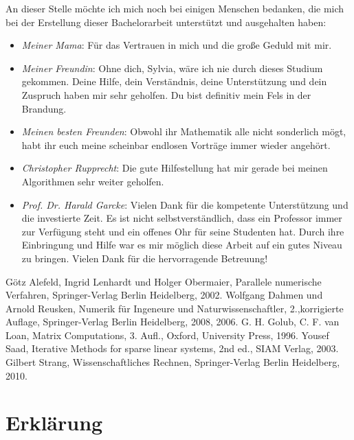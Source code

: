 \begin{large}
An dieser Stelle möchte ich mich noch bei einigen Menschen bedanken, die mich bei der Erstellung dieser Bachelorarbeit unterstützt und ausgehalten haben:
\begin{itemize}
\item \textit{Meiner Mama}: Für das Vertrauen in mich und die große Geduld mit mir.
\item \textit{Meiner Freundin}: Ohne dich, Sylvia, wäre ich nie durch dieses Studium gekommen. Deine Hilfe, dein Verständnis, deine Unterstützung und dein Zuspruch haben mir sehr geholfen. Du bist definitiv mein Fels in der Brandung.
\item \textit{Meinen besten Freunden}: Obwohl ihr Mathematik alle nicht sonderlich mögt, habt ihr euch meine scheinbar endlosen Vorträge immer wieder angehört.
\item \textit{Christopher Rupprecht}: Die gute Hilfestellung hat mir gerade bei meinen Algorithmen sehr weiter geholfen.
\item \textit{Prof. Dr. Harald Garcke}:  Vielen Dank für die kompetente Unterstützung und die investierte Zeit. Es ist nicht selbstverständlich, dass ein Professor immer zur Verfügung steht und ein offenes Ohr für seine Studenten hat. Durch ihre Einbringung und Hilfe war es mir möglich diese Arbeit auf ein gutes Niveau zu bringen. Vielen Dank für die hervorragende Betreuung!
\end{itemize}
\end{large}

\begin{thebibliography}{56}

Götz Alefeld, Ingrid Lenhardt und Holger Obermaier,
Parallele numerische Verfahren,
Springer-Verlag Berlin Heidelberg,
2002.
Wolfgang Dahmen und Arnold Reusken,
Numerik für Ingeneure und Naturwissenschaftler,
2.,korrigierte Auflage,
Springer-Verlag Berlin Heidelberg,
2008, 2006.
G. H. Golub, C. F. van Loan,
Matrix Computations,
3. Aufl.,
Oxford,
University Press,
1996.
Yousef Saad,
Iterative Methods for sparse linear systems,
2nd ed.,
SIAM Verlag,
2003.
Gilbert Strang,
Wissenschaftliches Rechnen,
Springer-Verlag Berlin Heidelberg,
2010.

\end{thebibliography}


\chapter*{Erklärung}

